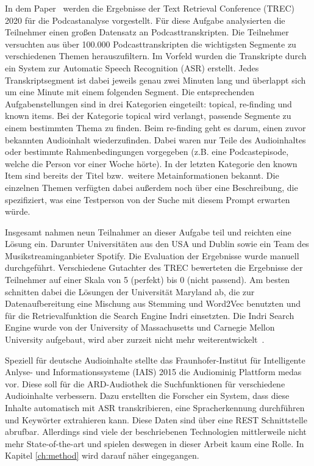 In dem Paper~\cite{jones2021} werden die Ergebnisse der Text Retrieval Conference (TREC) 2020 für die Podcastanalyse vorgestellt.
Für diese Aufgabe analysierten die Teilnehmer einen großen Datensatz an Podcasttranskripten.
Die Teilnehmer versuchten aus über 100.000 Podcasttranskripten die wichtigsten Segmente zu verschiedenen Themen herauszufiltern.
Im Vorfeld wurden die Transkripte durch ein System zur Automatic Speech Recognition (ASR) erstellt.
Jedes Transkriptsegment ist dabei jeweils genau zwei Minuten lang und überlappt sich um eine Minute mit einem folgenden Segment.
Die entsprechenden Aufgabenstellungen sind in drei Kategorien eingeteilt: topical, re-finding und known items.
Bei der Kategorie topical wird verlangt, passende Segmente zu einem bestimmten Thema zu finden.
Beim re-finding geht es darum, einen zuvor bekannten Audioinhalt wiederzufinden.
Dabei waren nur Teile des Audioinhaltes oder bestimmte Rahmenbedingungen vorgegeben (z.B. eine Podcastepisode, welche die Person vor einer Woche hörte).
In der letzten Kategorie den known Item sind bereits der Titel bzw.\ weitere Metainformationen bekannt.
Die einzelnen Themen verfügten dabei außerdem noch über eine Beschreibung, die spezifiziert, was eine Testperson von der Suche mit diesem Prompt erwarten würde.


Insgesamt nahmen neun Teilnahmer an dieser Aufgabe teil und reichten eine Lösung ein.
Darunter Universitäten aus den USA und Dublin sowie ein Team des Musikstreaminganbieter Spotify.
Die Evaluation der Ergebnisse wurde manuell durchgeführt.
Verschiedene Gutachter des TREC bewerteten die Ergebnisse der Teilnehmer auf einer Skala von 5 (perfekt) bis 0 (nicht passend).
Am besten schnitten dabei die Lösungen der Universität Maryland ab, die zur Datenaufbereitung eine Mischung aus Stemming und Word2Vec benutzten und für die Retrievalfunktion die Search Engine Indri einsetzten.
Die Indri Search Engine wurde von der University of Massachusetts und Carnegie Mellon University aufgebaut, wird aber zurzeit nicht mehr weiterentwickelt~\cite{lemur}.


Speziell für deutsche Audioinhalte stellte das Fraunhofer-Institut für Intelligente Anlyse- und Informationssysteme (IAIS) 2015 die Audiominig Plattform medas vor.
Diese soll für die ARD-Audiothek die Suchfunktionen für verschiedene Audioinhalte verbessern.
Dazu erstellten die Forscher ein System, dass diese Inhalte automatisch mit ASR transkribieren, eine Spracherkennung durchführen und Keywörter extrahieren kann.
Diese Daten sind über eine REST Schnittstelle abrufbar.
Allerdings sind viele der beschriebenen Technologien mittlerweile nicht mehr State-of-the-art und spielen deswegen in dieser Arbeit kaum eine Rolle.
In Kapitel \autoref{ch:method} wird darauf näher eingegangen.~\cite{maroni2020}
